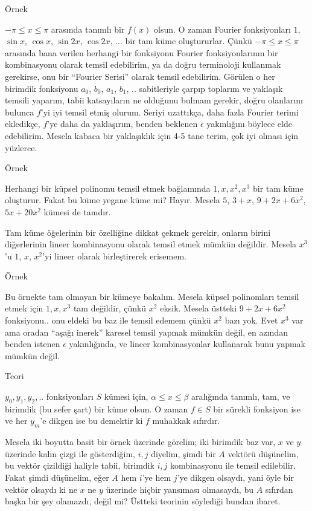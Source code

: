 \documentclass[12pt,fleqn]{article}\usepackage{../../common}
\begin{document}
Örnek

$-\pi \le x \le \pi$ arasında tanımlı bir $f(x)$ olsun. O zaman Fourier
fonksiyonları $1$, $\sin x$, $\cos x$, $\sin 2x$, $\cos 2x$, ... bir tam küme
oluştururlar. Çünkü $-\pi \le x \le \pi$ arasında bana verilen herhangi bir
fonksiyonu Fourier fonksiyonlarının bir kombinasyonu olarak temsil edebilirim,
ya da doğru terminoloji kullanmak gerekirse, onu bir ``Fourier Serisi'' olarak
temsil edebilirim. Görülen o her birimdik fonksiyonu $a_0$, $b_0$, $a_1$, $b_1$,
.. sabitleriyle çarpıp toplarım ve yaklaşık temsili yaparım, tabii katsayıların
ne olduğunu bulmam gerekir, doğru olanlarını bulunca $f$'yi iyi temsil etmiş
olurum. Seriyi uzattıkça, daha fazla Fourier terimi ekledikçe, $f$'ye daha da
yaklaşırım, benden beklenen $\epsilon$ yakınlığını böylece elde edebilirim. 
Mesela kabaca bir yaklaşıklık için 4-5 tane terim, çok iyi olması için
yüzlerce. 

Örnek

Herhangi bir küpsel polinomu temsil etmek bağlamında $1,x,x^2,x^3$ bir tam küme
oluşturur. Fakat bu küme yegane küme mi? Hayır. Mesela $5$, $3+x$, $9 + 2x +
6x^2$, $5x + 20x^2$ kümesi de tamdır.

Tam küme öğelerinin bir özelliğine dikkat çekmek gerekir, onların birini
diğerlerinin lineer kombinasyonu olarak temsil etmek mümkün değildir.
Mesela $x^3$'u $1$, $x$, $x^2$'yi lineer olarak birleştirerek erisemem. 

Örnek

Bu örnekte tam olmayan bir kümeye bakalım. Mesela küpsel polinomları temsil
etmek için $1,x,x^3$ tam değildir, çünkü $x^2$ eksik. Mesela üstteki
$9 + 2x + 6x^2$ fonksiyonu.. onu eldeki bu baz ile temsil edemem çünkü
$x^2$ bazı yok. Evet $x^3$ var ama oradan ``aşağı inerek'' karesel temsil
yapmak mümkün değil, en azından benden istenen $\epsilon$ yakınlığında,
ve lineer kombinasyonlar kullanarak bunu yapmak mümkün değil.

Teori

$y_0,y_1,y_2,..$ fonksiyonları $S$ kümesi için, $\alpha \le x \le \beta$
aralığında tanımlı, tam, ve birimdik (bu sefer şart) bir küme olsun. O zaman
$f \in S$ bir sürekli fonksiyon ise ve her $y_m$'e dikgen ise bu demektir ki
$f$ muhakkak sıfırdır.

Mesela iki boyutta basit bir örnek üzerinde görelim; iki birimdik baz var, $x$
ve $y$ üzerinde kalın çizgi ile gösterdiğim, $i,j$ diyelim, şimdi bir $A$
vektörü düşünelim, bu vektör çizildiği haliyle tabii, birimdik $i,j$
kombinasyonu ile temsil edilebilir. Fakat şimdi düşünelim, eğer $A$
hem $i$'ye hem $j$'ye dikgen olsaydı, yani öyle bir vektör olsaydı ki
ne $x$ ne $y$ üzerinde hiçbir yansıması olmasaydı, bu $A$ sıfırdan başka
bir şey olamazdı, değil mi? Üstteki teorinin söylediği bundan ibaret. 
\end{document}
